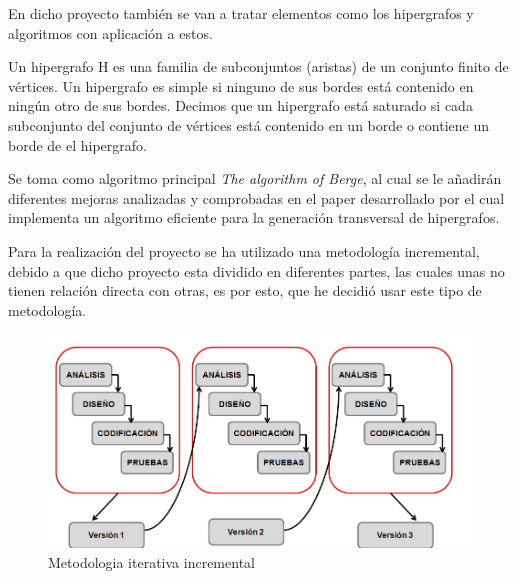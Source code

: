 \documentclass{cosas/tfg_domingo}
\begin{document}

\newpage

En dicho proyecto también se van a tratar elementos como los hipergrafos
y algoritmos con aplicación a estos.

Un hipergrafo H es una familia de subconjuntos (aristas) de un conjunto finito de vértices. Un hipergrafo es simple si ninguno de sus bordes está contenido en ningún otro de sus bordes. Decimos que un hipergrafo está saturado si cada subconjunto del conjunto de vértices está contenido en un borde o contiene un borde de el hipergrafo. \citep{Thomas}

Se toma como algoritmo principal \textit{The algorithm of Berge}, al cual se le añadirán diferentes mejoras analizadas y comprobadas en el paper desarrollado por \citep{JGAA-107} el cual implementa un algoritmo eficiente para la generación transversal de hipergrafos.


\hfill
{}

%


\begin{center}
\end{center}

\newpage

Para la realización del proyecto se ha utilizado una metodología incremental, debido a que dicho proyecto esta dividido en diferentes partes, las cuales unas no tienen relación directa con otras, es por esto, que he decidió usar este tipo de metodología.

\begin{figure}[ht!] %
\begin{center}
\includegraphics[width=.6\linewidth]{imagenes/Metodologia.png}
\end{center}
\caption{Metodologia iterativa incremental}
\label{fig_pro}
\end{figure}
\end{document}

